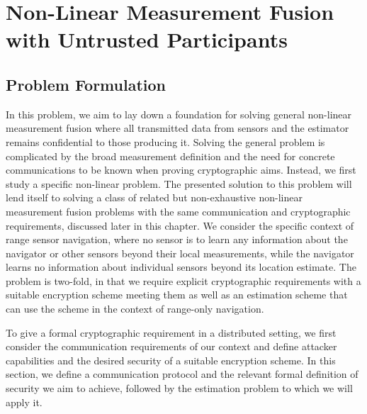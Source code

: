 
\chapter{Non-Linear Measurement Fusion with Untrusted Participants}\label{ch:nonlin_fusion}

% 
%                                              
%                                              
%                                              
% 

\section{Problem Formulation}\label{sec:nonlin_fusion:problem}
In this problem, we aim to lay down a foundation for solving general non-linear measurement fusion where all transmitted data from sensors and the estimator remains confidential to those producing it. Solving the general problem is complicated by the broad measurement definition and the need for concrete communications to be known when proving cryptographic aims. Instead, we first study a specific non-linear problem. The presented solution to this problem will lend itself to solving a class of related but non-exhaustive non-linear measurement fusion problems with the same communication and cryptographic requirements, discussed later in this chapter. We consider the specific context of range sensor navigation, where no sensor is to learn any information about the navigator or other sensors beyond their local measurements, while the navigator learns no information about individual sensors beyond its location estimate. The problem is two-fold, in that we require explicit cryptographic requirements with a suitable encryption scheme meeting them as well as an estimation scheme that can use the scheme in the context of range-only navigation.

To give a formal cryptographic requirement in a distributed setting, we first consider the communication requirements of our context and define attacker capabilities and the desired security of a suitable encryption scheme. In this section, we define a communication protocol and the relevant formal definition of security we aim to achieve, followed by the estimation problem to which we will apply it.

